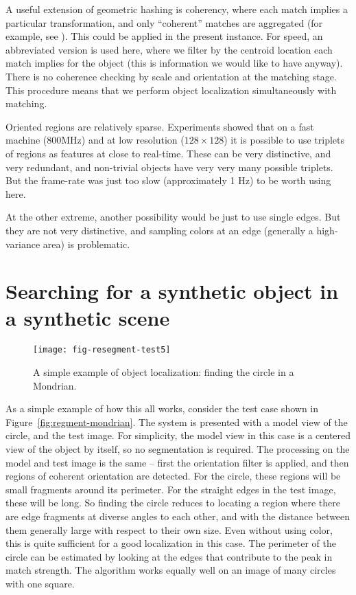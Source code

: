 
A useful extension of geometric hashing is coherency, where
each match implies a particular transformation, and only ``coherent''
matches are aggregated (for example, see \cite{lamiroy96rapid}).
%
This could be applied in the present instance.  For speed, an
abbreviated version is used here, where we filter by the centroid
location each match implies for the object (this is information we
would like to have anyway).  There is no coherence checking by scale
and orientation at the matching stage.  
%
This procedure means that we perform object localization
simultaneously with matching.

Oriented regions are relatively sparse.  Experiments showed that on a
fast machine (800MHz) and at low resolution ($128\times 128$) it is
possible to use triplets of regions as features at close to real-time.
These can be very distinctive, and very redundant, and non-trivial
objects have very very many possible triplets.  But the frame-rate
was just too slow (approximately 1 Hz) to be worth using here.

At the other extreme, another possibility would be just to use single
edges.  But they are not very distinctive, and sampling colors at an
edge (generally a high-variance area) is problematic.


\section{Searching for a synthetic object in a synthetic scene}


\begin{figure}[tb]
\centerline{\texttt{[image: fig-resegment-test5]}}
\caption[Another example]{ 
%
%
A simple example of object localization: finding the circle in a
Mondrian.  
%
}
\end{figure}


As a simple example of how this all works,
consider the test case shown in Figure~\ref{fig:regment-mondrian}.
The system is presented with a model view of the
circle, and the test image.  For simplicity, the model view in 
this case is a centered view of the object by itself, so no
segmentation is required.  The processing on the model and
test image is the same -- first the orientation filter is applied, and
then regions of coherent orientation are detected.
For the circle, these regions will be small fragments around its
perimeter.  For the straight edges in the test image, these will
be long.  So finding the circle reduces to locating a region
where there are edge fragments at diverse angles to each other,
and with the distance between them generally large with respect
to their own size.  Even without using color, this is quite sufficient
for a good localization in this case.  The perimeter
of the circle can be estimated by looking at the edges that
contribute to the peak in match strength.
The algorithm works equally well on an image of many circles
with one square.


